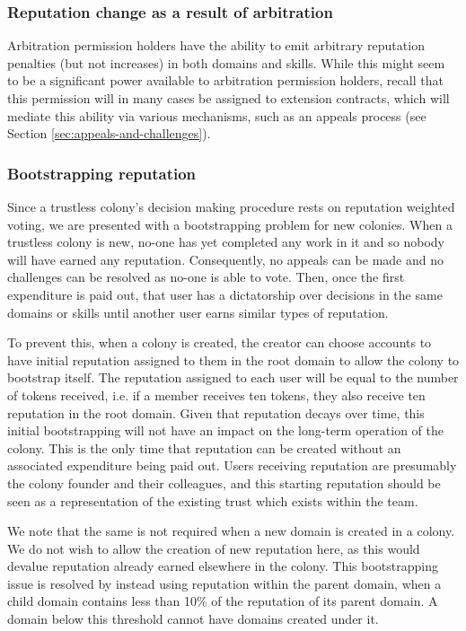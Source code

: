 \subsubsection*{Reputation change as a result of arbitration}\label{sec:earning-rep-in-challenges}

Arbitration permission holders have the ability to emit arbitrary reputation penalties (but not increases) in both domains and skills. While this might seem to be a significant power available to arbitration permission holders, recall that this permission will in many cases be assigned to extension contracts, which will mediate this ability via various mechanisms, such as an appeals process (see Section \ref{sec:appeals-and-challenges}).

\subsubsection*{Bootstrapping reputation}\label{sec:bootstrapping-rep}

Since a trustless colony's decision making procedure rests on reputation weighted voting, we are presented with a bootstrapping problem for new colonies. When a trustless colony is new, no-one has yet completed any work in it and so nobody will have earned any reputation. Consequently, no appeals can be made and no challenges can be resolved as no-one is able to vote. Then, once the first expenditure is paid out, that user has a dictatorship over decisions in the same domains or skills until another user earns similar types of reputation.

To prevent this, when a colony is created, the creator can choose accounts to have initial reputation assigned to them in the root domain to allow the colony to bootstrap itself. The reputation assigned to each user will be equal to the number of tokens received, i.e. if a member receives ten tokens, they also receive ten reputation in the root domain. Given that reputation decays over time, this initial bootstrapping will not have an impact on the long-term operation of the colony. This is the only time that reputation can be created without an associated expenditure being paid out. Users receiving reputation are presumably the colony founder and their colleagues, and this starting reputation should be seen as a representation of the existing trust which exists within the team.

We note that the same is not required when a new domain is created in a colony. We do not wish to allow the creation of new reputation here, as this would devalue reputation already earned elsewhere in the colony. This bootstrapping issue is resolved by instead using reputation within the parent domain, when a child domain contains less than 10\% of the reputation of its parent domain. A domain below this threshold cannot have domains created under it.

